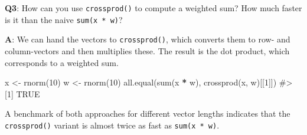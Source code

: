 \documentclass[
]{krantz}
\makeatletter
\newenvironment{Shaded}{\begin{snugshade}}{\end{snugshade}}
\newcommand{\CommentTok}[1]{\textcolor[rgb]{0.56,0.35,0.01}{\textit{#1}}}
\newcommand{\DecValTok}[1]{\textcolor[rgb]{0.00,0.00,0.81}{#1}}
\newcommand{\KeywordTok}[1]{\textcolor[rgb]{0.13,0.29,0.53}{\textbf{#1}}}
\newcommand{\NormalTok}[1]{#1}
\newcommand{\OperatorTok}[1]{\textcolor[rgb]{0.81,0.36,0.00}{\textbf{#1}}}
\newcommand{\StringTok}[1]{\textcolor[rgb]{0.31,0.60,0.02}{#1}}
\newenvironment{kframe}{%
\medskip{}
\setlength{\fboxsep}{.8em}
 \def\at@end@of@kframe{}%
 \ifinner\ifhmode%
  \def\at@end@of@kframe{\end{minipage}}%
  \begin{minipage}{\columnwidth}%
 \fi\fi%
 \def\FrameCommand##1{\hskip\@totalleftmargin \hskip-\fboxsep
 \colorbox{shadecolor}{##1}\hskip-\fboxsep
     \hskip-\linewidth \hskip-\@totalleftmargin \hskip\columnwidth}%
 \MakeFramed {\advance\hsize-\width
   \@totalleftmargin\z@ \linewidth\hsize
   \@setminipage}}%
 {\par\unskip\endMakeFramed%
 \at@end@of@kframe}
\renewenvironment{Shaded}{\begin{kframe}}{\end{kframe}}
\renewcommand{\KeywordTok} [1]{\textcolor[rgb]{0.00,0.44,0.13}{{#1}}}
\renewcommand{\DecValTok}  [1]{\textcolor[rgb]{0.25,0.63,0.44}{{#1}}}
\renewcommand{\StringTok}  [1]{\textcolor[rgb]{0.25,0.44,0.63}{{#1}}}
\renewcommand{\CommentTok} [1]{\textcolor[rgb]{0.38,0.63,0.69}{{#1}}}
\renewcommand{\NormalTok}  [1]{{#1}}
\makeatother
\begin{document}
\textbf{{Q3}}: How can you use \texttt{crossprod()} to compute a weighted sum? How much faster is it than the naive \texttt{sum(x\ *\ w)}?

\textbf{{A}}: We can hand the vectors to \texttt{crossprod()}, which converts them to row- and column-vectors and then multiplies these. The result is the dot product, which corresponds to a weighted sum.

\begin{Shaded}
\begin{Highlighting}[]
\NormalTok{x <-}\StringTok{ }\KeywordTok{rnorm}\NormalTok{(}\DecValTok{10}\NormalTok{)}
\NormalTok{w <-}\StringTok{ }\KeywordTok{rnorm}\NormalTok{(}\DecValTok{10}\NormalTok{)}
\KeywordTok{all.equal}\NormalTok{(}\KeywordTok{sum}\NormalTok{(x }\OperatorTok{*}\StringTok{ }\NormalTok{w), }\KeywordTok{crossprod}\NormalTok{(x, w)[[}\DecValTok{1}\NormalTok{]])}
\CommentTok{#> [1] TRUE}
\end{Highlighting}
\end{Shaded}

A benchmark of both approaches for different vector lengths indicates that the \texttt{crossprod()} variant is almost twice as fast as \texttt{sum(x\ *\ w)}.
\end{document}
